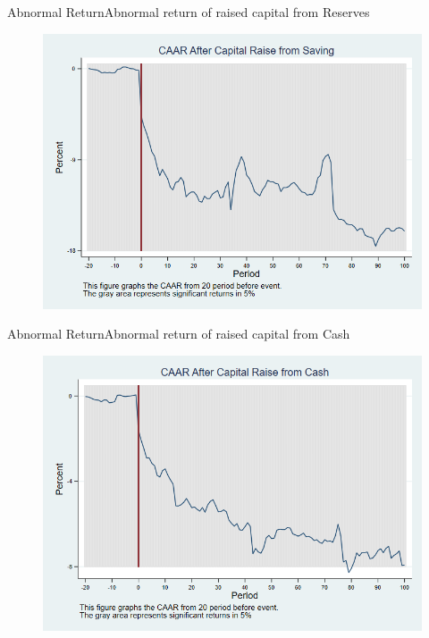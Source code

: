 \documentclass{beamer}
\begin{document}
\begin{frame}{Abnormal Return}{Abnormal return of raised capital from Reserves}
	\label{car_marketmodel_industrySaving}
	\begin{figure}
		\centering
		\includegraphics[width=0.65\linewidth]{Output/car_marketmodel_industrySaving.png}
		\label{fig:car_marketmodel_industrySaving}
	\end{figure}
\end{frame}


\begin{frame}{Abnormal Return}{Abnormal return of raised capital from Cash}
	\label{car_marketmodel_industryCash}
	\begin{figure}
		\centering
		\includegraphics[width=0.65\linewidth]{Output/car_marketmodel_industryCash.png}
		\label{fig:car_marketmodel_industryCash}
	\end{figure}
	
\end{frame}
\end{document}
